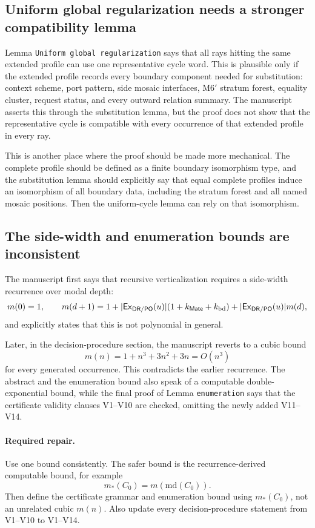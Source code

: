 \documentclass[11pt]{article}
\newcommand{\DR}{\mathsf{DR}}
\newcommand{\PO}{\mathsf{PO}}
\newcommand{\Ex}{\mathsf{Ex}}
\newcommand{\Mate}{\mathsf{Mate}}
\begin{document}
\subsection{Uniform global regularization needs a stronger compatibility lemma}

Lemma \texttt{Uniform global regularization} says that all rays hitting the same
extended profile can use one representative cycle word.  This is plausible only
if the extended profile records every boundary component needed for
substitution: context scheme, port pattern, side mosaic interfaces, M6$'$ stratum
forest, equality cluster, request status, and every outward relation summary.
The manuscript asserts this through the substitution lemma, but the proof does
not show that the representative cycle is compatible with every occurrence of
that extended profile in every ray.

This is another place where the proof should be made more mechanical.  The
complete profile should be defined as a finite boundary isomorphism type, and
the substitution lemma should explicitly say that equal complete profiles induce
an isomorphism of all boundary data, including the stratum forest and all named
mosaic positions.  Then the uniform-cycle lemma can rely on that isomorphism.

\subsection{The side-width and enumeration bounds are inconsistent}

The manuscript first says that recursive verticalization requires a side-width
recurrence over modal depth:
\[
  m(0)=1,\qquad
  m(d+1)=1+|\Ex_{\DR/\PO}(u)|(1+k_{\Mate}+k_{\rm bd})
         +|\Ex_{\DR/\PO}(u)|m(d),
\]
and explicitly states that this is not polynomial in general.

Later, in the decision-procedure section, the manuscript reverts to a cubic
bound
\[
  m(n)=1+n^3+3n^2+3n=O(n^3)
\]
for every generated occurrence.  This contradicts the earlier recurrence.  The
abstract and the enumeration bound also speak of a computable double-exponential
bound, while the final proof of Lemma \texttt{enumeration} says that the
certificate validity clauses V1--V10 are checked, omitting the newly added
V11--V14.

\paragraph{Required repair.}
Use one bound consistently.  The safer bound is the recurrence-derived
computable bound, for example
\[
  m_*(C_0)=m(\mathrm{md}(C_0)).
\]
Then define the certificate grammar and enumeration bound using $m_*(C_0)$, not
an unrelated cubic $m(n)$.  Also update every decision-procedure statement from
V1--V10 to V1--V14.
\end{document}
